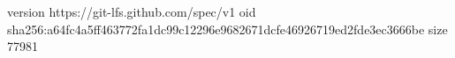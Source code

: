 version https://git-lfs.github.com/spec/v1
oid sha256:a64fc4a5ff463772fa1dc99c12296e9682671dcfe46926719ed2fde3ec3666be
size 77981
